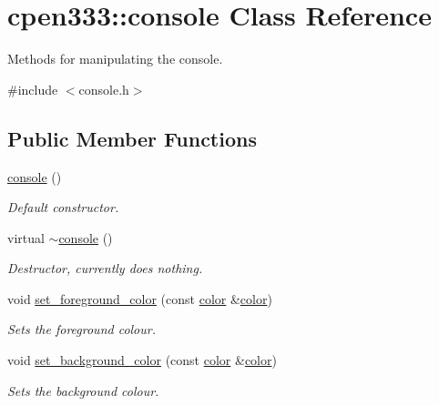 \hypertarget{classcpen333_1_1console}{}\section{cpen333\+:\+:console Class Reference}
\label{classcpen333_1_1console}


Methods for manipulating the console.  




{\ttfamily \#include $<$console.\+h$>$}

\subsection*{Public Member Functions}
\begin{DoxyCompactItemize}
\item 
\mbox{\label{classcpen333_1_1console_abe9315029ea04b6de1c1a0f992c3361f}} 
\hyperlink{classcpen333_1_1console_abe9315029ea04b6de1c1a0f992c3361f}{console} ()
\begin{DoxyCompactList}\small\item\em Default constructor. \end{DoxyCompactList}\item 
virtual \hyperlink{classcpen333_1_1console_aef92248b810d1bbf207081e910d12545}{$\sim$console} ()
\begin{DoxyCompactList}\small\item\em Destructor, currently does nothing. \end{DoxyCompactList}\item 
void \hyperlink{classcpen333_1_1console_a0710a0e8e75562c189bcf81837f01fa4}{set\+\_\+foreground\+\_\+color} (const \hyperlink{console_8h_a915749711f4fc63cca8581af0c1106b3}{color} \&\hyperlink{console_8h_a915749711f4fc63cca8581af0c1106b3}{color})
\begin{DoxyCompactList}\small\item\em Sets the foreground colour. \end{DoxyCompactList}\item 
void \hyperlink{classcpen333_1_1console_a2328c0819515e1d3508cd1018f62c674}{set\+\_\+background\+\_\+color} (const \hyperlink{console_8h_a915749711f4fc63cca8581af0c1106b3}{color} \&\hyperlink{console_8h_a915749711f4fc63cca8581af0c1106b3}{color})
\begin{DoxyCompactList}\small\item\em Sets the background colour. \end{DoxyCompactList}\item 

\end{DoxyCompactItemize}
